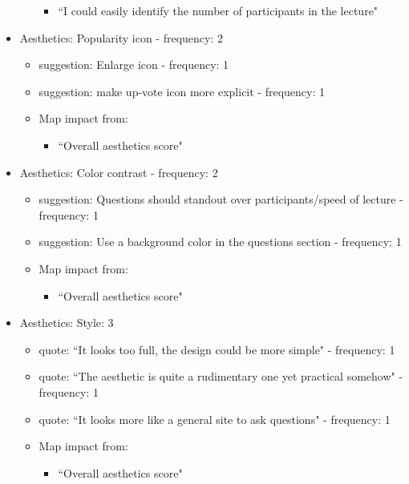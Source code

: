 \documentclass{article}
\begin{document}
\begin{itemize}
\begin{itemize}
        \begin{itemize}
            \item ``I could easily identify the number of participants in the lecture"
        \end{itemize}
    \end{itemize}
    \item Aesthetics: Popularity icon - frequency: 2
    \begin{itemize}
        \item suggestion: Enlarge icon - frequency: 1
        \item suggestion: make up-vote icon more explicit - frequency: 1
        \item Map impact from:
        \begin{itemize}
            \item ``Overall aesthetics score"
        \end{itemize}
    \end{itemize}
    \item Aesthetics: Color contrast - frequency: 2
    \begin{itemize}
        \item suggestion: Questions should standout over participants/speed of lecture - frequency: 1
        \item suggestion: Use a background color in the questions section - frequency: 1
        \item Map impact from:
        \begin{itemize}
            \item ``Overall aesthetics score"
        \end{itemize}
    \end{itemize}
    \item Aesthetics: Style: 3
    \begin{itemize}
        \item quote: ``It looks too full, the design could be more simple" - frequency: 1
        \item quote: ``The aesthetic is quite a rudimentary one yet practical somehow" - frequency: 1
        \item quote: ``It looks more like a general site to ask questions" - frequency: 1
        \item Map impact from:
        \begin{itemize}
            \item ``Overall aesthetics score"
        \end{itemize}
    \end{itemize}
    
\end{itemize}     
\end{document}
